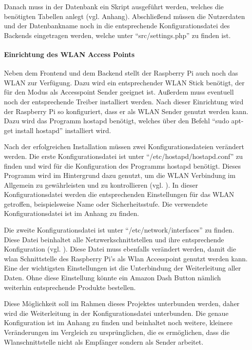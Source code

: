Danach muss in der Datenbank ein Skript ausgeführt werden, welches die benötigten Tabellen anlegt (vgl. Anhang). Abschließend müssen die Nutzerdaten und der Datenbankname noch in die entsprechende Konfigurationsdatei des Backends eingetragen werden, welche unter ``src/settings.php'' zu finden ist. 

\paragraph{Einrichtung des WLAN Access Points}$\;$ \\ 
\label{sec:Einrichtung des WLAN Access Points-1} 
Neben dem Frontend und dem Backend stellt der Raspberry Pi auch noch das WLAN zur Verfügung. Dazu wird ein entsprechender WLAN Stick benötigt, der für den Modus als Accesspoint Sender geeignet ist. Außerdem muss eventuell noch der entsprechende Treiber installiert werden. Nach dieser Einrichtung wird der Raspberry Pi so konfiguriert, dass er als WLAN Sender genutzt werden kann. Dazu wird das Programm hostapd benötigt, welches über den Befehl ``sudo apt-get install hostapd'' installiert wird. 

Nach der erfolgreichen Installation müssen zwei Konfigurationsdateien verändert werden. Die erste Konfigurationsdatei ist unter ``/etc/hostapd/hostapd.conf'' zu finden und wird für die Konfiguration des Programms hostapd benötigt. Dieses Programm wird im Hintergrund dazu genutzt, um die WLAN Verbindung im Allgemein zu gewährleisten und zu kontrollieren (vgl. \cite{.o}\cite{.n}). In dieser Konfigurationsdatei werden die entsprechenden Einstellungen für das WLAN getroffen, beispielsweise Name oder Sicherheitsstufe. Die verwendete Konfigurationsdatei ist im Anhang zu finden.

Die zweite Konfigurationsdatei ist unter ``/etc/network/interfaces'' zu finden. Diese Datei beinhaltet alle Netzwerkschnittstellen und ihre entsprechende Konfiguration (vgl. \cite{.p}). Diese Datei muss ebenfalls verändert werden, damit die wlan Schnittstelle des Raspberry Pi's als Wlan Accesspoint genutzt werden kann. Eine der wichtigsten Einstellungen ist die Unterbindung der Weiterleitung aller Daten. Ohne diese Einstellung könnte ein Amazon Dash Button nämlich weiterhin entsprechende Produkte bestellen. 

Diese Möglichkeit soll im Rahmen dieses Projektes unterbunden werden, daher wird die Weiterleitung in der Konfigurationsdatei unterbunden. Die genaue Konfiguration ist im Anhang zu finden und beinhaltet noch weitere, kleinere Veränderungen im Vergleich zu ursprünglichen, die es ermöglichen, dass die Wlanschnittstelle nicht als Empfänger sondern als Sender arbeitet.

